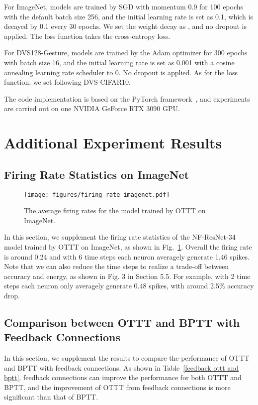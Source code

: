 \documentclass{article}
\begin{document}
For ImageNet, models are trained by SGD with momentum 0.9 for 100 epochs with the default batch size 256, and the initial learning rate is set as 0.1, which is decayed by 0.1 every 30 epochs. We set the weight decay as , and no dropout is applied. The loss function takes the cross-entropy loss.

For DVS128-Gesture, models are trained by the Adam optimizer for 300 epochs with batch size 16, and the initial learning rate is set as 0.001 with a cosine annealing learning rate scheduler to 0. No dropout is applied. As for the loss function, we set  following DVS-CIFAR10.

The code implementation is based on the PyTorch framework~\cite{paszke2019pytorch}, and experiments are carried out on one NVIDIA GeForce RTX 3090 GPU.

\section{Additional Experiment Results}

\subsection{Firing Rate Statistics on ImageNet}

\begin{figure}[h]
	\centering
	\texttt{[image: figures/firing\_rate\_imagenet.pdf]}
	\caption{The average firing rates for the model trained by OTTT on ImageNet.}
	\label{firing rate imagenet}
\end{figure}

In this section, we supplement the firing rate statistics of the NF-ResNet-34 model trained by OTTT on ImageNet, as shown in Fig.~\ref{firing rate imagenet}. Overall the firing rate is around 0.24 and with 6 time steps each neuron averagely generate 1.46 spikes. Note that we can also reduce the time steps to realize a trade-off between accuracy and energy, as shown in Fig. 3 in Section 5.5. For example, with 2 time steps each neuron only averagely generate 0.48 spikes, with around 2.5\% accuracy drop.

\subsection{Comparison between OTTT and BPTT with Feedback Connections}

In this section, we supplement the results to compare the performance of OTTT and BPTT with feedback connections. As shown in Table~\ref{feedback ottt and bptt}, feedback connections can improve the performance for both OTTT and BPTT, and the improvement of OTTT from feedback connections is more significant than that of BPTT.
\end{document}
